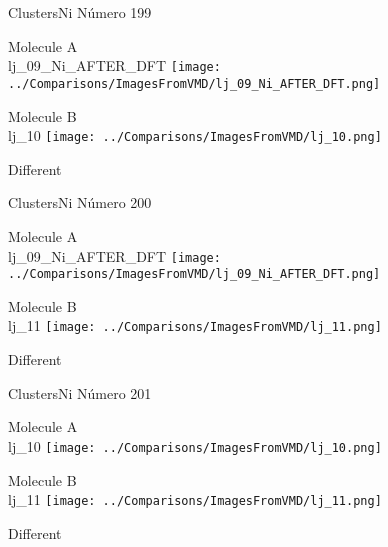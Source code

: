  \newpage

\vtab[-3cm]
\begin{center}
{\large ClustersNi \tab Número 199}
\end{center}
\begin{multicols}{2}
\begin{center}
Molecule A \\ 
lj\_09\_Ni\_AFTER\_DFT
\texttt{[image: ../Comparisons/ImagesFromVMD/lj\_09\_Ni\_AFTER\_DFT.png]}
\\
\vtab

\columnbreak
Molecule B \\ 
lj\_10
\texttt{[image: ../Comparisons/ImagesFromVMD/lj\_10.png]}
\\
\vtab


\end{center}
\end{multicols}
\begin{center}
\textcolor{NavyBlue}{\Large Different}
\end{center}

 \newpage

\vtab[-3cm]
\begin{center}
{\large ClustersNi \tab Número 200}
\end{center}
\begin{multicols}{2}
\begin{center}
Molecule A \\ 
lj\_09\_Ni\_AFTER\_DFT
\texttt{[image: ../Comparisons/ImagesFromVMD/lj\_09\_Ni\_AFTER\_DFT.png]}
\\
\vtab

\columnbreak
Molecule B \\ 
lj\_11
\texttt{[image: ../Comparisons/ImagesFromVMD/lj\_11.png]}
\\
\vtab


\end{center}
\end{multicols}
\begin{center}
\textcolor{NavyBlue}{\Large Different}
\end{center}

 \newpage

\vtab[-3cm]
\begin{center}
{\large ClustersNi \tab Número 201}
\end{center}
\begin{multicols}{2}
\begin{center}
Molecule A \\ 
lj\_10
\texttt{[image: ../Comparisons/ImagesFromVMD/lj\_10.png]}
\\
\vtab

\columnbreak
Molecule B \\ 
lj\_11
\texttt{[image: ../Comparisons/ImagesFromVMD/lj\_11.png]}
\\
\vtab


\end{center}
\end{multicols}
\begin{center}
\textcolor{NavyBlue}{\Large Different}
\end{center}

